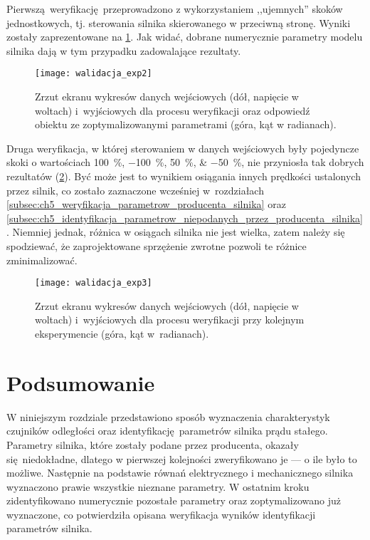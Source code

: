 Pierwszą weryfikację przeprowadzono z wykorzystaniem ,,ujemnych'' skoków jednostkowych, tj. sterowania silnika skierowanego w przeciwną stronę. Wyniki zostały zaprezentowane na \cref{fig:silnik_weryfikacja_parametrow}. Jak widać, dobrane numerycznie parametry modelu silnika dają w tym przypadku zadowalające rezultaty.

\begin{figure}[h]
    \centering
    \texttt{[image: walidacja\_exp2]}
    \caption{Zrzut ekranu wykresów danych wejściowych (dół, napięcie w woltach) i~wyjściowych dla procesu weryfikacji oraz odpowiedź obiektu ze zoptymalizowanymi parametrami (góra, kąt w radianach).}
    \label{fig:silnik_weryfikacja_parametrow}
\end{figure}

Druga weryfikacja, w której sterowaniem w danych wejściowych były pojedyncze skoki o wartościach \SIlist{100;-100;50;-50}{\percent}, nie przyniosła tak dobrych rezultatów (\cref{fig:silnik_nieudana_weryfikacja_parametrow}). Być może jest to wynikiem osiągania innych prędkości ustalonych przez silnik, co zostało zaznaczone wcześniej w~rozdziałach \ref{subsec:ch5_weryfikacja_parametrow_producenta_silnika} oraz \ref{subsec:ch5_identyfikacja_parametrow_niepodanych_przez_producenta_silnika}. Niemniej jednak, różnica w osiągach silnika nie jest wielka, zatem należy się spodziewać, że zaprojektowane sprzężenie zwrotne pozwoli te różnice zminimalizować.

\begin{figure}[h]
    \centering
    \texttt{[image: walidacja\_exp3]}
    \caption{Zrzut ekranu wykresów danych wejściowych (dół, napięcie w woltach) i~wyjściowych dla procesu weryfikacji przy kolejnym eksperymencie (góra, kąt w~radianach).}
    \label{fig:silnik_nieudana_weryfikacja_parametrow}
\end{figure}

\section{Podsumowanie}

W niniejszym rozdziale przedstawiono sposób wyznaczenia charakterystyk czujników odległości oraz identyfikację parametrów silnika prądu stałego. Parametry silnika, które zostały podane przez producenta, okazały się niedokładne, dlatego w pierwszej kolejności zweryfikowano je --- o ile było to możliwe. Następnie na podstawie równań elektrycznego i mechanicznego silnika wyznaczono prawie wszystkie nieznane parametry. W ostatnim kroku zidentyfikowano numerycznie pozostałe parametry oraz zoptymalizowano już wyznaczone, co potwierdziła opisana weryfikacja wyników identyfikacji parametrów silnika.

